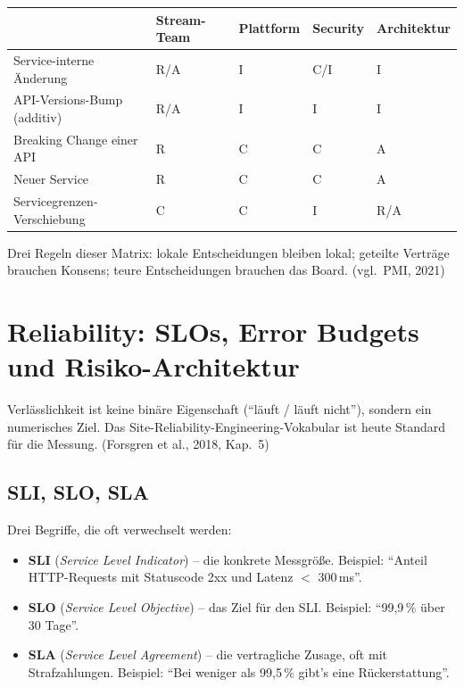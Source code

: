 \documentclass[11pt,a4paper,oneside]{article}
\newcommand{\fachbegriff}[1]{\textbf{#1}}
\newcommand{\quelle}[1]{{\footnotesize\color{lpGray}(#1)}}
\begin{document}
\begin{tabularx}{\linewidth}{@{}l X X X X@{}}
\toprule
& \textbf{Stream-Team} & \textbf{Plattform} & \textbf{Security} & \textbf{Architektur} \\
\midrule
Service-interne Änderung & R/A & I & C/I & I \\
API-Versions-Bump (additiv) & R/A & I & I & I \\
Breaking Change einer API & R & C & C & A \\
Neuer Service & R & C & C & A \\
Servicegrenzen-Verschiebung & C & C & I & R/A \\
\bottomrule
\end{tabularx}

\medskip

\noindent Drei Regeln dieser Matrix: lokale Entscheidungen bleiben lokal; geteilte Verträge brauchen Konsens; teure Entscheidungen brauchen das Board. \quelle{vgl.\ PMI, 2021}

\section{Reliability: SLOs, Error Budgets und Risiko-Architektur}

Verlässlichkeit ist keine binäre Eigenschaft (``läuft / läuft nicht''), sondern ein numerisches Ziel. Das Site-Reliability-Engineering-Vokabular ist heute Standard für die Messung. \quelle{Forsgren et al., 2018, Kap.~5}

\subsection{SLI, SLO, SLA}

Drei Begriffe, die oft verwechselt werden:

\begin{itemize}
  \item \fachbegriff{SLI} (\emph{Service Level Indicator}) -- die konkrete Messgröße. Beispiel: ``Anteil HTTP-Requests mit Statuscode 2xx und Latenz $<$ 300\,ms''.
  \item \fachbegriff{SLO} (\emph{Service Level Objective}) -- das Ziel für den SLI. Beispiel: ``99,9\,\% über 30 Tage''.
  \item \fachbegriff{SLA} (\emph{Service Level Agreement}) -- die vertragliche Zusage, oft mit Strafzahlungen. Beispiel: ``Bei weniger als 99,5\,\% gibt's eine Rückerstattung''.
\end{itemize}
\end{document}
